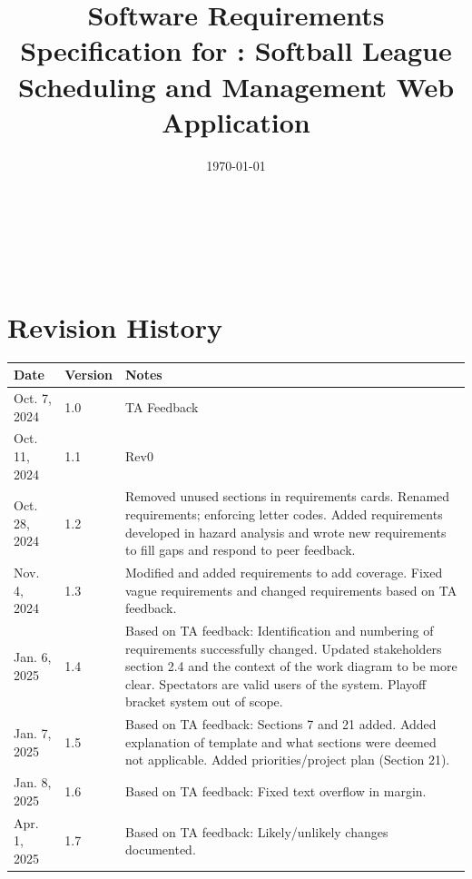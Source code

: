 \documentclass[12pt]{article}
\begin{document}
\title{Software Requirements Specification for \progname: Softball League Scheduling and Management Web Application} 
\author{\authname}
\date{\today}
	
\maketitle

~\newpage


\tableofcontents

~\newpage

\section*{Revision History}

\begin{tabularx}{\textwidth}{p{3cm}p{2cm}X}
\toprule {\textbf{Date}} & {\textbf{Version}} & {\textbf{Notes}}\\
\midrule
Oct. 7, 2024 & 1.0 & TA Feedback\\
Oct. 11, 2024 & 1.1 & Rev0\\
Oct. 28, 2024 & 1.2 & Removed unused sections in requirements cards. Renamed
requirements; enforcing letter codes. Added requirements developed in hazard
analysis and wrote new requirements to fill gaps and respond to peer feedback.
\\
Nov. 4, 2024 & 1.3 & Modified and added requirements to add coverage. Fixed
vague requirements and changed requirements based on TA feedback.\\
Jan. 6, 2025 & 1.4 & Based on TA feedback: Identification and numbering of requirements successfully changed.
Updated stakeholders section 2.4 and the context of the work diagram to be more clear.
Spectators are valid users of the system. Playoff bracket system out of scope.\\
Jan. 7, 2025 & 1.5 & Based on TA feedback: Sections 7 and 21 added. Added explanation of template and
what sections were deemed not applicable. Added priorities/project plan (Section 21).\\
Jan. 8, 2025 & 1.6 & Based on TA feedback: Fixed text overflow in margin.\\
Apr. 1, 2025 & 1.7 & Based on TA feedback: Likely/unlikely changes documented.\\
\bottomrule
\end{tabularx}

~\\
\end{document}
